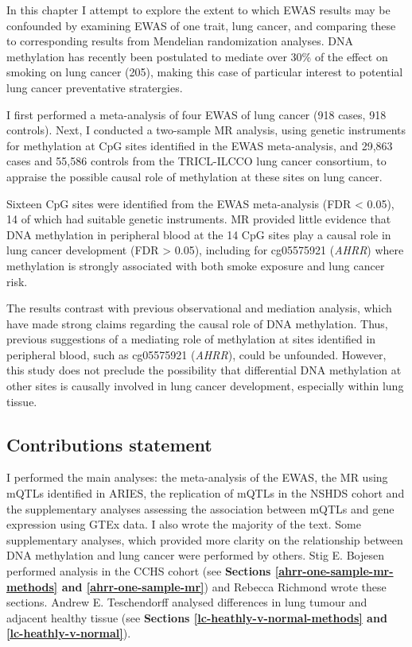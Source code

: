 \documentclass[11pt,oneside]{bristolthesis}
\begin{document}
In this chapter I attempt to explore the extent to which EWAS results may be confounded by examining EWAS of one trait, lung cancer, and comparing these to corresponding results from Mendelian randomization analyses. DNA methylation has recently been postulated to mediate over 30\% of the effect on smoking on lung cancer (205), making this case of particular interest to potential lung cancer preventative stratergies.

I first performed a meta-analysis of four EWAS of lung cancer (918 cases, 918 controls). Next, I conducted a two-sample MR analysis, using genetic instruments for methylation at CpG sites identified in the EWAS meta-analysis, and 29,863 cases and 55,586 controls from the TRICL-ILCCO lung cancer consortium, to appraise the possible causal role of methylation at these sites on lung cancer.

Sixteen CpG sites were identified from the EWAS meta-analysis (FDR \textless{} 0.05), 14 of which had suitable genetic instruments. MR provided little evidence that DNA methylation in peripheral blood at the 14 CpG sites play a causal role in lung cancer development (FDR \textgreater{} 0.05), including for cg05575921 (\emph{AHRR}) where methylation is strongly associated with both smoke exposure and lung cancer risk.

The results contrast with previous observational and mediation analysis, which have made strong claims regarding the causal role of DNA methylation. Thus, previous suggestions of a mediating role of methylation at sites identified in peripheral blood, such as cg05575921 (\emph{AHRR}), could be unfounded. However, this study does not preclude the possibility that differential DNA methylation at other sites is causally involved in lung cancer development, especially within lung tissue.

\hypertarget{contributions-statement-07}{%
\subsection{Contributions statement}\label{contributions-statement-07}}

I performed the main analyses: the meta-analysis of the EWAS, the MR using mQTLs identified in ARIES, the replication of mQTLs in the NSHDS cohort and the supplementary analyses assessing the association between mQTLs and gene expression using GTEx data. I also wrote the majority of the text. Some supplementary analyses, which provided more clarity on the relationship between DNA methylation and lung cancer were performed by others. Stig E. Bojesen performed analysis in the CCHS cohort (see \textbf{Sections \ref{ahrr-one-sample-mr-methods} and \ref{ahrr-one-sample-mr}}) and Rebecca Richmond wrote these sections. Andrew E. Teschendorff analysed differences in lung tumour and adjacent healthy tissue (see \textbf{Sections \ref{lc-heathly-v-normal-methods} and \ref{lc-heathly-v-normal}}).
\end{document}
